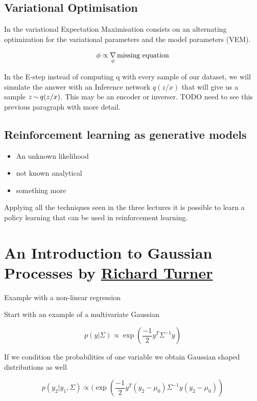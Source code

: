 \documentclass[b5paper]{report}
\begin{document}
\section{Variational Optimisation}

In the variational Expectation Maximisation consists on an alternating
optimization for the variational parameters and the model parameters (VEM).

\begin{align}
  \phi \propto \operatorname*{\nabla}_\phi  \text{missing equation}
\end{align}

In the E-step instead of computing q with every sample of our dataset, we will
simulate the answer with an Inference network $q(z/x)$ that will give us a
sample $z \operatorname*{\sim} q(z/x)$. This may be an encoder or inverser. TODO need to see
this previous paragraph with more detail.

\section{Reinforcement learning as generative models}

\begin{itemize}
  \item An unknown likelihood
  \item not known analytical
  \item something more
\end{itemize}


Applying all the techniques seen in the three lectures it is possible to learn
a policy learning that can be used in reinforcement learning.
\chapter{An Introduction to Gaussian Processes by
\href{http://learning.eng.cam.ac.uk/Public/Turner/WebHome}{Richard Turner}}

Example with a non-linear regression

Start with an example of a multivariate Gaussian

\begin{equation}
  p(y|\Sigma) \propto  \exp (\frac{-1}{2} y^T \Sigma^{-1}y)
\end{equation}

If we condition the probabilities of one variable we obtain Gaussian shaped
distributions as well


\begin{equation}
  p(y_2 | y_1, \Sigma) \propto (\exp (\frac{-1}{2} y^T (y_2 - \mu_0)\Sigma^{-1}y(y_2 - \mu_0))
\end{equation}
\end{document}
